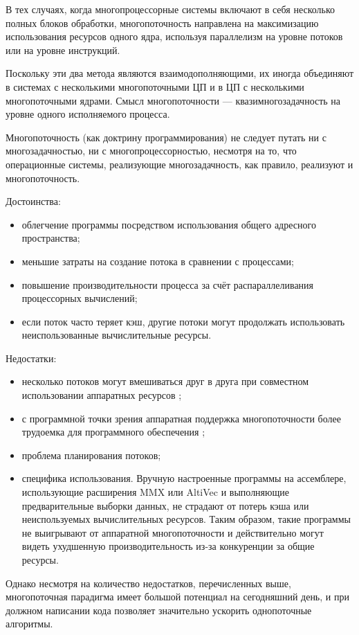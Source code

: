 \documentclass[a4paper,oneside,14pt]{extreport}
\begin{document}
В тех случаях, когда многопроцессорные системы включают в себя несколько полных блоков обработки,
многопоточность направлена на максимизацию использования ресурсов одного ядра,
используя параллелизм на уровне потоков или на уровне инструкций.

Поскольку эти два метода являются взаимодополняющими,
их иногда объединяют в системах с несколькими многопоточными ЦП
и в ЦП с несколькими многопоточными ядрами.
Смысл многопоточности — квазимногозадачность на уровне одного исполняемого процесса.

Многопоточность (как доктрину программирования) не следует путать ни с многозадачностью,
ни с многопроцессорностью, несмотря на то, что операционные системы,
реализующие многозадачность, как правило, реализуют и многопоточность.

Достоинства:
\begin{itemize}
	\item облегчение программы посредством использования общего адресного пространства;
	\item меньшие затраты на создание потока в сравнении с процессами;
	\item повышение производительности процесса за счёт распараллеливания процессорных вычислений;
	\item если поток часто теряет кэш, другие потоки могут продолжать
	использовать неиспользованные вычислительные ресурсы.
\end{itemize}

Недостатки:
\begin{itemize}
	\item несколько потоков могут вмешиваться друг в друга при совместном
	использовании аппаратных ресурсов \cite{Nemirovsky};
	\item с программной точки зрения аппаратная поддержка многопоточности
	более трудоемка для программного обеспечения \cite{Olukotun};
	\item проблема планирования потоков;
	\item специфика использования. Вручную настроенные программы на ассемблере,
	использующие расширения MMX или AltiVec и выполняющие предварительные выборки данных,
	не страдают от потерь кэша или неиспользуемых вычислительных ресурсов.
	Таким образом, такие программы не выигрывают от аппаратной многопоточности
	и действительно могут видеть ухудшенную производительность из-за конкуренции за общие ресурсы.
\end{itemize}
	Однако несмотря на количество недостатков, перечисленных выше,
	многопоточная парадигма имеет большой потенциал на сегодняшний день,
	и при должном написании кода позволяет значительно ускорить однопоточные алгоритмы.
	
\end{document}
